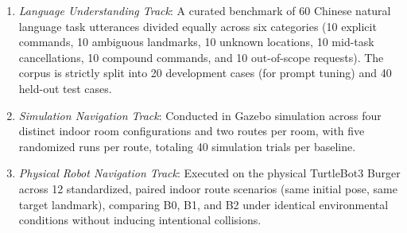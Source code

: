 \documentclass[conference]{IEEEtran}
\begin{document}
\begin{enumerate}
    \item \textit{Language Understanding Track}: A curated benchmark of 60 Chinese natural language task utterances divided equally across six categories (10 explicit commands, 10 ambiguous landmarks, 10 unknown locations, 10 mid-task cancellations, 10 compound commands, and 10 out-of-scope requests). The corpus is strictly split into 20 development cases (for prompt tuning) and 40 held-out test cases.
    \item \textit{Simulation Navigation Track}: Conducted in Gazebo simulation across four distinct indoor room configurations and two routes per room, with five randomized runs per route, totaling 40 simulation trials per baseline.
    \item \textit{Physical Robot Navigation Track}: Executed on the physical TurtleBot3 Burger across 12 standardized, paired indoor route scenarios (same initial pose, same target landmark), comparing B0, B1, and B2 under identical environmental conditions without inducing intentional collisions.
\end{enumerate}
\end{document}
